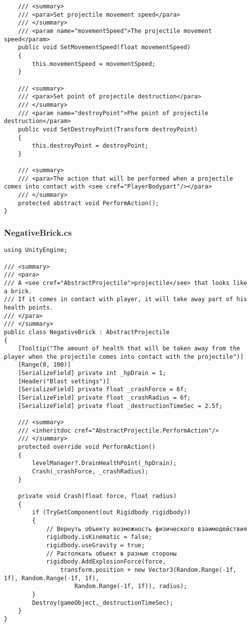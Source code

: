 \begin{verbatim}
    /// <summary>
    /// <para>Set projectile movement speed</para>
    /// </summary>
    /// <param name="movementSpeed">The projectile movement speed</param>
    public void SetMovementSpeed(float movementSpeed)
    {
        this.movementSpeed = movementSpeed;
    }

    /// <summary>
    /// <para>Set point of projectile destruction</para>
    /// </summary>
    /// <param name="destroyPoint">Phe point of projectile destruction</param>
    public void SetDestroyPoint(Transform destroyPoint)
    {
        this.destroyPoint = destroyPoint;
    }

    /// <summary>
    /// <para>The action that will be performed when a projectile comes into contact with <see cref="PlayerBodypart"/></para>
    /// </summary>
    protected abstract void PerformAction();
}
\end{verbatim}
\subsubsection*{NegativeBrick.cs}
\begin{verbatim}
using UnityEngine;

/// <summary>
/// <para>
/// A <see cref="AbstractProjectile">projectile</see> that looks like a brick.
/// If it comes in contact with player, it will take away part of his health points.
/// </para>
/// </summary>
public class NegativeBrick : AbstractProjectile
{
    [Tooltip("The amount of health that will be taken away from the player when the projectile comes into contact with the projectile")]
    [Range(0, 100)]
    [SerializeField] private int _hpDrain = 1;
    [Header("Blast settings")]
    [SerializeField] private float _crashForce = 6f;
    [SerializeField] private float _crashRadius = 6f;
    [SerializeField] private float _destructionTimeSec = 2.5f;

    /// <summary>
    /// <inheritdoc cref="AbstractProjectile.PerformAction"/>
    /// </summary>
    protected override void PerformAction()
    {
        levelManager?.DrainHealthPoint(_hpDrain);
        Crash(_crashForce, _crashRadius);
    }

    private void Crash(float force, float radius)
    {
        if (TryGetComponent(out Rigidbody rigidbody))
        {
            // Вернуть объекту возможность физического взаимодействия
            rigidbody.isKinematic = false;
            rigidbody.useGravity = true;
            // Растолкать объект в разные стороны
            rigidbody.AddExplosionForce(force,
                transform.position + new Vector3(Random.Range(-1f, 1f), Random.Range(-1f, 1f),
                    Random.Range(-1f, 1f)), radius);
        }
        Destroy(gameObject,_destructionTimeSec);
    }
}
\end{verbatim}
